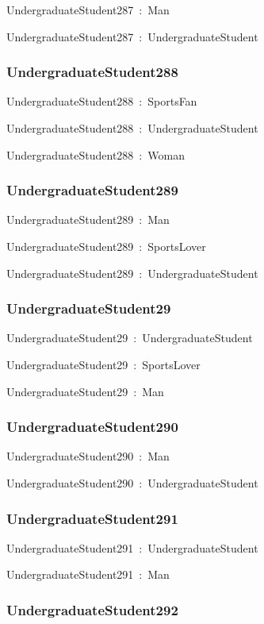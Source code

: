 \documentclass{article}
\begin{document}
UndergraduateStudent287~:~Man

UndergraduateStudent287~:~UndergraduateStudent

\subsubsection*{UndergraduateStudent288}

UndergraduateStudent288~:~SportsFan

UndergraduateStudent288~:~UndergraduateStudent

UndergraduateStudent288~:~Woman

\subsubsection*{UndergraduateStudent289}

UndergraduateStudent289~:~Man

UndergraduateStudent289~:~SportsLover

UndergraduateStudent289~:~UndergraduateStudent

\subsubsection*{UndergraduateStudent29}

UndergraduateStudent29~:~UndergraduateStudent

UndergraduateStudent29~:~SportsLover

UndergraduateStudent29~:~Man

\subsubsection*{UndergraduateStudent290}

UndergraduateStudent290~:~Man

UndergraduateStudent290~:~UndergraduateStudent

\subsubsection*{UndergraduateStudent291}

UndergraduateStudent291~:~UndergraduateStudent

UndergraduateStudent291~:~Man

\subsubsection*{UndergraduateStudent292}
\end{document}
